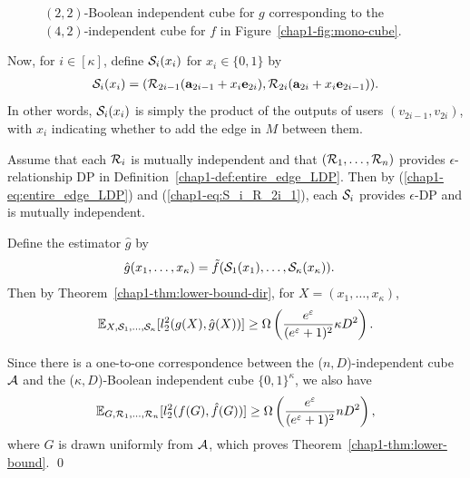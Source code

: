 {\begin{figure}[t]
  \caption{
    $(2,2)$-Boolean independent cube for $g$ corresponding to the $(4,2)$-independent cube for $f$ in Figure~\ref{chap1-fig:mono-cube}.
  }\label{chap1-fig:Bool-cube}
\end{figure}

Now, for $i \in [\kappa]$, define $\mathcal{S}_i(x_i)$ for $x_i \in \{0,1\}$ by
\begin{align}
  \mathcal{S}_i(x_i) = (\mathcal{R}_{2i-1}(\mathbf{a}_{2i-1} + x_i \mathbf{e}_{2i}),
  \mathcal{R}_{2i}(\mathbf{a}_{2i} + x_i \mathbf{e}_{2i-1})).
  \label{chap1-eq:S_i_R_2i_1}
\end{align}
In other words, $\mathcal{S}_i(x_i)$ is simply the product of the outputs of users
$(v_{2i-1}, v_{2i})$, with $x_i$ indicating whether to add the edge in $M$ between them.

Assume that each $\mathcal{R}_i$ is mutually independent and that $(\mathcal{R}_1, \ldots, \mathcal{R}_n)$ provides $\epsilon$-relationship DP in Definition~\ref{chap1-def:entire_edge_LDP}. 
Then by (\ref{chap1-eq:entire_edge_LDP}) and (\ref{chap1-eq:S_i_R_2i_1}), each $\mathcal{S}_i$ provides $\epsilon$-DP and is mutually independent.

Define the estimator $\hat{g}$ by
\begin{align*}
  \hat{g}(x_1, \ldots, x_\kappa) &= \tilde{f}(\mathcal{S}_1(x_1), \ldots,
  \mathcal{S}_\kappa(x_\kappa)).
\end{align*}
Then by 
Theorem~\ref{chap1-thm:lower-bound-dir}, 
for 
$X=(x_1, \ldots, x_\kappa)$, 
\[
  \mathbb{E}_{X,\mathcal{S}_1, \ldots, \mathcal{S}_\kappa}[l_2^2(g(X), \hat{g}(X) )] \geq \Omega \left(
  \frac{e^{\varepsilon}}{(e^{\varepsilon}+1)^2} \kappa D^2 \right).
\]

Since 
there is a one-to-one correspondence between the ($n,D$)-independent cube $\mathcal{A}$ 
and 
the ($\kappa,D$)-Boolean independent cube $\{0,1\}^\kappa$, we also have 
\[
  \mathbb{E}_{G,\mathcal{R}_1, \ldots, \mathcal{R}_n}[l_2^2(f(G), \hat{f}(G))] \geq \Omega \left(
  \frac{e^{\varepsilon}}{(e^{\varepsilon}+1)^2} n D^2 \right),
\]
where $G$ is drawn uniformly from $\mathcal{A}$, which proves Theorem~\ref{chap1-thm:lower-bound}. \qed

}
